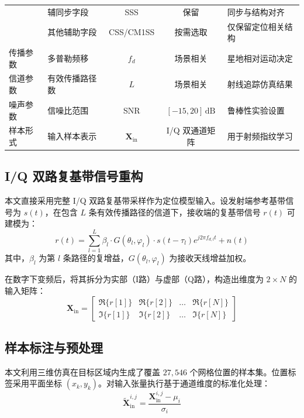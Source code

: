 \begin{table}[htbp]
\begin{tabular}{@{}llccl@{}}
        & 辅同步字段 & SSS & 保留 & 同步与结构对齐 \\
        & 其他辅助字段 & CSS/CM1SS & 按需选取 & 仅保留定位相关结构 \\
        传播参数 & 多普勒频移 & $f_d$ & 场景相关 & 星地相对运动决定 \\
        信道参数 & 有效传播路径数 & $L$ & 场景相关 & 射线追踪仿真结果 \\
        噪声参数 & 信噪比范围 & SNR & $[-15, 20]\,\text{dB}$ & 鲁棒性实验设置 \\
        样本形式 & 输入样本表示 & $\mathbf{X}_{\mathrm{in}}$ & I/Q 双通道矩阵 & 用于射频指纹学习 \\ \bottomrule
    \end{tabular}
\end{table}

\subsection{I/Q 双路复基带信号重构}

本文直接采用完整 I/Q 双路复基带采样作为定位模型输入。设发射端参考基带信号为 $s(t)$，在包含 $L$ 条有效传播路径的信道下，接收端的复基带信号 $r(t)$ 可建模为：
\begin{equation}
r(t) = \sum_{l=1}^{L} \beta_l \cdot G(\theta_l, \varphi_l) \cdot s(t - \tau_l) e^{j2\pi f_{d,l} t} + n(t)
\end{equation}
其中，$\beta_l$ 为第 $l$ 条路径的复增益，$G(\theta_l, \varphi_l)$ 为接收天线增益加权。

在数字下变频后，将其拆分为实部（I路）与虚部（Q路），构造出维度为 $2 \times N$ 的输入矩阵：
\begin{equation}
\mathbf{X}_{\mathrm{in}} = \begin{bmatrix} 
\Re\{r[1]\} & \Re\{r[2]\} & \dots & \Re\{r[N]\} \\ 
\Im\{r[1]\} & \Im\{r[2]\} & \dots & \Im\{r[N]\} 
\end{bmatrix}
\end{equation}

\subsection{样本标注与预处理}

本文利用三维仿真在目标区域内生成了覆盖 $27,546$ 个网格位置的样本集。位置标签采用平面坐标 $(x_k, y_k)$。对输入张量执行基于通道维度的标准化处理：
\begin{equation}
\tilde{\mathbf{X}}_{\mathrm{in}}^{i,j} = \frac{\mathbf{X}_{\mathrm{in}}^{i,j} - \mu_i}{\sigma_i}
\end{equation}

